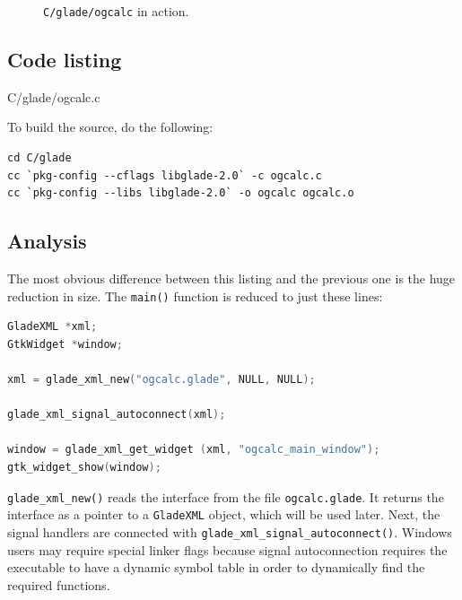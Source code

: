 \documentclass[a4paper,oneside]{article}
\newcommand{\filename}[1]{\texttt{#1}}
\newcommand{\program}[1]{\texttt{#1}}
\newcommand{\class}[1]{\texttt{#1}}
\newcommand{\function}[1]{\texttt{#1()}}
\begin{document}
\begin{figure}
  \centering
  \caption[\program{C/glade/ogcalc} in action]{\program{C/glade/ogcalc} in
    action.}
  \label{fig:ogcalcgl}
\end{figure}

\subsection{Code listing}


                 {C/glade/ogcalc.c}

To build the source, do the following:

\begin{verbatim}
cd C/glade
cc `pkg-config --cflags libglade-2.0` -c ogcalc.c
cc `pkg-config --libs libglade-2.0` -o ogcalc ogcalc.o
\end{verbatim}

\subsection{Analysis}

The most obvious difference between this listing and the previous one
is the huge reduction in size.  The \function{main} function is
reduced to just these lines:

\begin{lstlisting}[numbers=none, language=C]
GladeXML *xml;
GtkWidget *window;

xml = glade_xml_new("ogcalc.glade", NULL, NULL);

glade_xml_signal_autoconnect(xml);

window = glade_xml_get_widget (xml, "ogcalc_main_window");
gtk_widget_show(window);
\end{lstlisting}

\function{glade\_xml\_new} reads the interface from the file
\filename{ogcalc.glade}.  It returns the interface as a pointer to a
\class{GladeXML} object, which will be used later.  Next, the signal
handlers are connected with
\function{glade\_xml\_signal\_autoconnect}.  Windows users may require
special linker flags because signal autoconnection requires the
executable to have a dynamic symbol table in order to dynamically find
the required functions.
\end{document}
